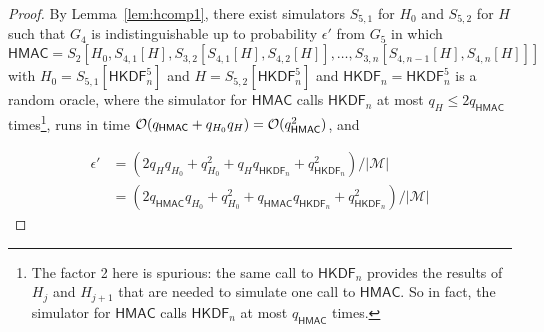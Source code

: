 \documentclass[compsoc, conference, letterpaper, 10pt, times]{IEEEtran}
\newif\ifapproxproba
\newcommand{\HKDF}{\mathsf{HKDF}}
\newcommand{\hmac}{\mathsf{HMAC}}
\newcommand{\Smac}{\mathcal{M}}
\newcommand{\ab}{\allowbreak}
\begin{document}
\begin{proof}
By Lemma~\ref{lem:hcomp1}, there exist simulators $S_{5,1}$ for $H_0$
and $S_{5,2}$ for $H$ such that
$G_4$ is indistinguishable up to probability $\epsilon'$
from $G_5$ in which
$\hmac = S_2[H_0, \ab S_{4,1}[H], \ab S_{3,2}[S_{4,1}[H], S_{4,2}[H]], \ab \dots, \ab S_{3,n}[S_{4,n-1}[H], S_{4,n}[H]]]$ with $H_0 = S_{5,1}[\HKDF^5_n]$ and $H = S_{5,2}[\HKDF^5_n]$
and $\HKDF_n = \HKDF^5_n$  is a random oracle, where
the simulator for $\hmac$ calls $\HKDF_n$ at most $q_H \leq 2 q_{\hmac}$
times\footnote{The factor 2 here is spurious: the same call to $\HKDF_n$
  provides the results of $H_j$ and $H_{j+1}$ that are needed to simulate
  one call to $\hmac$. So in fact, the simulator for $\hmac$ calls
  $\HKDF_n$ at most $q_{\hmac}$ times.},
runs in time ${\cal O}(q_{\hmac} + q_{H_0} q_H) = {\cal O}(q_{\hmac}^2)$,
and
\ifapproxproba
\begin{align*}
\epsilon' &= {\cal O}((q_H q_{H_0} + q_{H_0}^2 + q_H q_{\HKDF_n} + q_{\HKDF_n}^2)/|\Smac|)\\
& = {\cal O}((q_{\hmac}^2 + q_{\hmac}q_{\HKDF_n} + q_{\HKDF_n}^2)/|\Smac|) \\
&= {\cal O}((q_{\hmac} + q_{\HKDF_n})^2)/|\Smac|)\,.
\end{align*}
\else
\begin{align*}
\epsilon' &= (2q_H q_{H_0} + q_{H_0}^2 + q_H q_{\HKDF_n} + q_{\HKDF_n}^2)/|\Smac|\\
& = (2q_{\hmac}q_{H_0} + q_{H_0}^2 + q_{\hmac}q_{\HKDF_n} + q_{\HKDF_n}^2)/|\Smac| 
\end{align*}
\fi


\end{proof}
\end{document}
